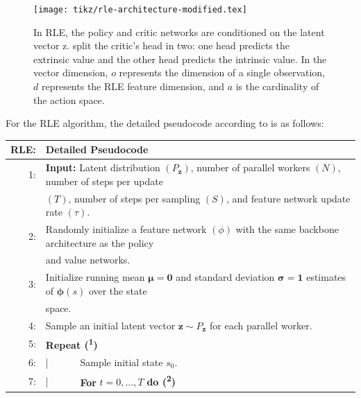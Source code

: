 \begin{figure}[h!]
  \centering
  \texttt{[image: tikz/rle-architecture-modified.tex]}
  \caption{In RLE, the policy and critic networks are conditioned on the latent vector z. \cite{rle-paper} split the critic's head in two: one head predicts the extrinsic value and the other head predicts the intrinsic value. In the vector dimension, $o$ represents the dimension of a single observation, $d$ represents the RLE feature dimension, and $a$ is the cardinality of the action space.}
  \label{fig:rle-architecture}
\end{figure}

\noindent For the RLE algorithm, the detailed pseudocode according to \cite{rle-paper} is as follows:

\hypertarget{algo-rle}{
\begin{table}[h!]
  \centering
  \begin{tabular}{rlllll}
    \hline\hline
    \textbf{RLE:} & \multicolumn{5}{l}{Detailed Pseudocode}\\
    \hline
    1: & \multicolumn{5}{l}{\textbf{Input:} Latent distribution $\left(P_{\textbf{z}}\right)$, number of parallel workers $\left(N\right)$, number of steps per update}\\
    & \multicolumn{5}{l}{$\left(T\right)$, number of steps per sampling $\left(S\right)$, and feature network update rate $\left(\tau\right)$.}\\
    2: & \multicolumn{5}{l}{Randomly initialize a feature network $\left(\phi\right)$ with the same backbone architecture as the policy }\\
    & \multicolumn{5}{l}{and value networks.}\\
    3: & \multicolumn{5}{l}{Initialize running mean $\boldsymbol{\mu} = \textbf{0}$ and standard deviation $\boldsymbol{\sigma} = \textbf{1}$ estimates of $\boldsymbol{\phi} \left(s\right)$ over the state}\\
    & \multicolumn{5}{l}{space.}\\
    4: & \multicolumn{5}{l}{Sample an initial latent vector $\textbf{z} \sim P_{\textbf{z}}$ for each parallel worker.}\\
    5: & \multicolumn{5}{l}{\textbf{Repeat (\textsuperscript{1})}}\\
    6: & | & \multicolumn{4}{l}{Sample initial state $s_{0}$.}\\
    7: & | & \multicolumn{4}{l}{\textbf{For} $t = 0, ..., T$ \textbf{do (\textsuperscript{2})}}\\

\end{tabular}
\end{table}}
